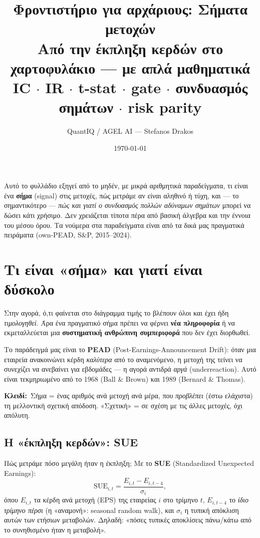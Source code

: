 \documentclass[11pt]{article}
\title{\textbf{Φροντιστήριο για αρχάριους: Σήματα μετοχών}\\[3pt]
\large Από την έκπληξη κερδών στο χαρτοφυλάκιο --- με απλά μαθηματικά\\[-1pt]
\normalsize\textcolor{accent}{IC $\cdot$ IR $\cdot$ t-stat $\cdot$ gate $\cdot$ συνδυασμός σημάτων $\cdot$ risk parity}}
\author{QuantIQ / AGEL AI --- Stefanos Drakos}\date{\today}
\newcommand{\SUE}{\mathrm{SUE}}\newcommand{\IC}{\mathrm{IC}}\newcommand{\IR}{\mathrm{IR}}\newcommand{\AR}{\mathrm{AR}}
\newcommand{\key}[1]{\par\medskip\noindent\colorbox{soft}{\parbox{\dimexpr\linewidth-2\fboxsep}{\textcolor{accent}{\textbf{Κλειδί:}}\ #1}}\par\medskip}
\begin{document}
\maketitle\thispagestyle{empty}

\noindent Αυτό το φυλλάδιο εξηγεί από το μηδέν, με μικρά αριθμητικά παραδείγματα, τι είναι ένα
\textbf{σήμα} (signal) στις μετοχές, πώς μετράμε αν είναι αληθινό ή τύχη, και --- το σημαντικότερο ---
\emph{πώς και γιατί ο συνδυασμός πολλών αδύναμων σημάτων} μπορεί να δώσει κάτι χρήσιμο. Δεν χρειάζεται
τίποτα πέρα από βασική άλγεβρα και την έννοια του μέσου όρου. Τα νούμερα στα παραδείγματα είναι από τα
δικά μας πραγματικά πειράματα (own-PEAD, S\&P, 2015--2024).

\tableofcontents
\bigskip

\section{Τι είναι «σήμα» και γιατί είναι δύσκολο}

Στην αγορά, ό,τι φαίνεται στο διάγραμμα τιμής το βλέπουν όλοι και έχει ήδη \emph{τιμολογηθεί}. Άρα ένα
πραγματικό σήμα πρέπει να φέρνει \textbf{νέα πληροφορία} ή να εκμεταλλεύεται μια \textbf{συστηματική
ανθρώπινη συμπεριφορά} που δεν έχει διορθωθεί.

Το παράδειγμά μας είναι το \textbf{PEAD} (Post-Earnings-Announcement Drift): όταν μια εταιρεία ανακοινώνει
κέρδη \emph{καλύτερα} από το αναμενόμενο, η μετοχή της τείνει να συνεχίζει να ανεβαίνει για εβδομάδες ---
η αγορά αντιδρά \emph{αργά} (underreaction). Αυτό είναι τεκμηριωμένο από το 1968 (Ball \& Brown) και 1989
(Bernard \& Thomas).

\key{Σήμα = ένας αριθμός ανά μετοχή ανά μέρα, που \emph{προβλέπει} (έστω ελάχιστα) τη μελλοντική
σχετική απόδοση. «Σχετική» = σε σχέση με τις άλλες μετοχές, όχι απόλυτη.}

\subsection{Η «έκπληξη κερδών»: SUE}
Πώς μετράμε πόσο μεγάλη ήταν η έκπληξη; Με το \textbf{SUE} (Standardized Unexpected Earnings):
\[
\SUE_{i,t}=\frac{E_{i,t}-E_{i,t-4}}{\sigma_i},
\]
όπου $E_{i,t}$ τα κέρδη ανά μετοχή (EPS) της εταιρείας $i$ στο τρίμηνο $t$, $E_{i,t-4}$ το \emph{ίδιο
τρίμηνο πέρσι} (η «αναμονή»: seasonal random walk), και $\sigma_i$ η τυπική απόκλιση αυτών των
ετήσιων μεταβολών. Δηλαδή: «πόσες τυπικές αποκλίσεις πάνω/κάτω από το συνηθισμένο ήταν η μεταβολή».
\end{document}
